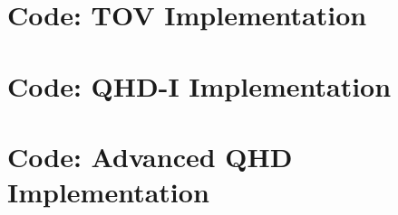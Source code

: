 \chapter{Code: TOV Implementation}\label{ch: tov code}



\chapter{Code: QHD-I Implementation}\label{ch: qhd1 code}



\chapter{Code: Advanced QHD Implementation}\label{ch: advanced code}


